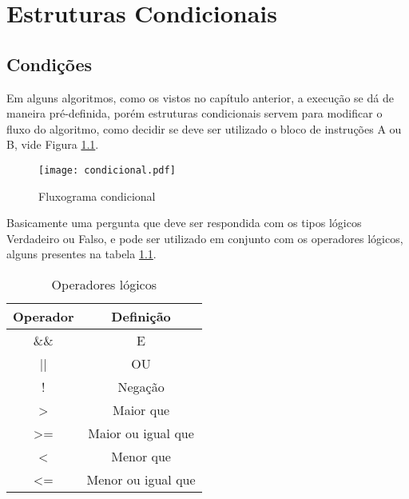 \chapter{Estruturas Condicionais}
\section{Condições}
Em alguns algoritmos, como os vistos no capítulo anterior, a execução se dá de maneira pré-definida, porém estruturas condicionais servem para modificar o fluxo do algoritmo, como decidir se deve ser utilizado o bloco de instruções A ou B, vide Figura \ref{fig:fluxo}.
\begin{figure}[!h]
    \centering
    \texttt{[image: condicional.pdf]}
    \caption{Fluxograma condicional}
    \label{fig:fluxo}
\end{figure}
Basicamente uma pergunta que deve ser respondida com os tipos lógicos Verdadeiro ou Falso, e pode ser utilizado em conjunto com os operadores lógicos, alguns presentes na tabela \ref{tab:operadoresLogicos}.
\begin{table}[!h]
\centering
\caption{Operadores lógicos}
\label{tab:operadoresLogicos}
\begin{tabular}{cc} \hline \hline
Operador      & Definição          \\ \hline
\&\&          & E                  \\
||            & OU                 \\
!             & Negação            \\
\textgreater  & Maior que          \\
\textgreater= & Maior ou igual que \\
\textless     & Menor que          \\
\textless=    & Menor ou igual que \\ \hline \hline

\end{tabular}
\end{table}

